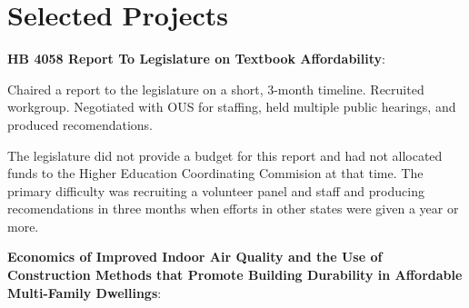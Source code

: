 \documentclass[margin]{res}
\begin{document}
\begin{resume}
\begin{position}
\end{position}


% 

\section{Selected Projects}
\par
\textbf{HB 4058 Report To Legislature on Textbook Affordability}: 

Chaired a report to the legislature on a short, 3-month timeline.  Recruited workgroup. Negotiated with OUS for staffing, held multiple public hearings, and produced recomendations.

The legislature did not provide a budget for this report and had not allocated funds to the Higher Education Coordinating Commision at that time.  The primary difficulty was recruiting a volunteer panel and staff and producing recomendations in three months when efforts in other states were given a year or more.

\par

\textbf{Economics of Improved Indoor Air Quality and the Use of Construction Methods that Promote Building Durability in Affordable Multi-Family Dwellings}:


\end{resume}
\end{document}
